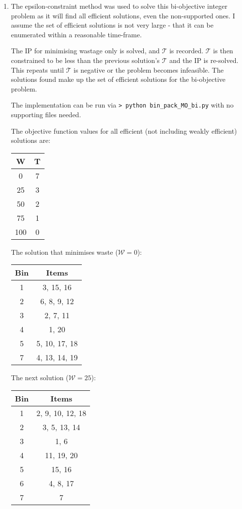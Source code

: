 \documentclass[10pt,a4paper]{article}
\begin{document}
\begin{enumerate}
\item 
The epsilon-constraint method was used to solve this bi-objective integer problem as it will find all efficient solutions, even the non-supported ones. I assume the set of efficient solutions is not very large - that it can be enumerated within a reasonable time-frame.

The IP for minimising wastage only is solved, and \(\mathcal{T}\) is recorded. \(\mathcal{T}\) is then constrained to be less than the previous solution's \(\mathcal{T}\) and the IP is re-solved. This repeats until \(\mathcal{T}\) is negative or the problem becomes infeasible. The solutions found make up the set of efficient solutions for the bi-objective problem.

The implementation can be run via \lstinline|> python bin_pack_MO_bi.py| with no supporting files needed.

The objective function values for all efficient (not including weakly efficient) solutions are:
\begin{table}[H]
	\centering
\begin{tabular}{|c|c|}
	\hline 
	W & T \\ 
	\hline 
	0 & 7 \\ 
	\hline 
	25 & 3 \\ 
	\hline 
	50 & 2 \\ 
	\hline 
	75 & 1 \\ 
	\hline 
	100 & 0 \\ 
	\hline 
\end{tabular}
\end{table} 
The solution that minimises waste (\(\mathcal{W} = 0\)): 
\begin{table}[H]
\centering
\begin{tabular}{|c|c|}
	\hline 
	Bin & Items \\ 
	\hline 
	1 & 3, 15, 16 \\ 
	\hline 
	2 & 6, 8, 9, 12 \\ 
	\hline 
	3 & 2, 7, 11 \\ 
	\hline 
	4 & 1, 20 \\ 
	\hline 
	5 & 5, 10, 17, 18 \\ 
	\hline 
	7 & 4, 13, 14, 19\\ 
	\hline 
\end{tabular}
\end{table}
The next solution (\(\mathcal{W} = 25\)):
\begin{table}[H]
	\centering
\begin{tabular}{|c|c|}
	\hline 
	Bin & Items \\ 
	\hline 
	1 & 2, 9, 10, 12, 18 \\ 
	\hline 
	2 & 3, 5, 13, 14 \\ 
	\hline 
	3 & 1, 6 \\ 
	\hline 
	4 & 11, 19, 20 \\ 
	\hline 
	5 & 15, 16 \\ 
	\hline 
	6 & 4, 8, 17 \\ 
	\hline 
	7 & 7 \\ 
	\hline 
\end{tabular} 
\end{table}


\end{enumerate}
\end{document}
